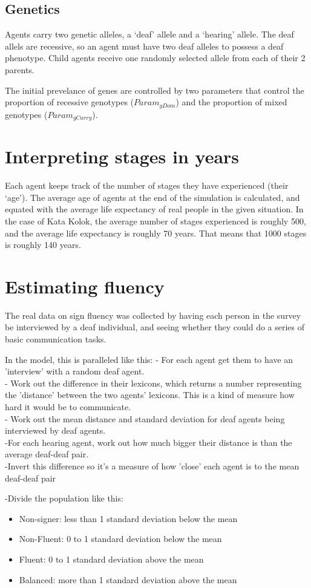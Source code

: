 \documentclass[11pt, oneside]{article}
\begin{document}
\subsection{Genetics}
Agents carry two genetic alleles, a `deaf' allele and a `hearing' allele.  The deaf allels are recessive, so an agent must have two deaf alleles to possess a deaf phenotype.  Child agents receive one randomly selected allele from each of their 2 parents.

The initial prevelance of genes are controlled by two parameters that control the proportion of recessive genotypes ($Param_{gDom}$) and the proportion of mixed genotypes ($Param_{gCarry}$).

\section{Interpreting stages in years}
Each agent keeps track of the number of stages they have experienced (their `age').  The average age of agents at the end of the simulation is calculated, and equated with the average life expectancy of real people in the given situation.  In the case of Kata Kolok, the average number of stages experienced is roughly 500, and the average life expectancy is roughly 70 years.  That means that 1000 stages is roughly 140 years.

\section{Estimating fluency}

The real data on sign fluency was collected by having each person in the survey be interviewed by a deaf individual, and seeing whether they could do a series of basic communication tasks.

In the model, this is paralleled like this:
- For each agent get them to have an 'interview' with a random deaf agent.\\
- Work out the difference in their lexicons, which returns a number representing the 'distance' between the two agents' lexicons.  This is a kind of measure how hard it would be to communicate.\\
- Work out the mean distance and standard deviation for deaf agents being interviewed by deaf agents.\\
-For each hearing agent, work out how much bigger their distance is than the average deaf-deaf pair.\\
-Invert this difference so it's a measure of how 'close' each agent is to the mean deaf-deaf pair

-Divide the population like this:
\begin{itemize}
\item Non-signer: less than 1 standard deviation below the mean
\item Non-Fluent: 0 to 1 standard deviation below the mean
\item Fluent: 0 to 1 standard deviation above the mean
\item Balanced: more than 1 standard deviation above the mean
\end{itemize}
\end{document}
